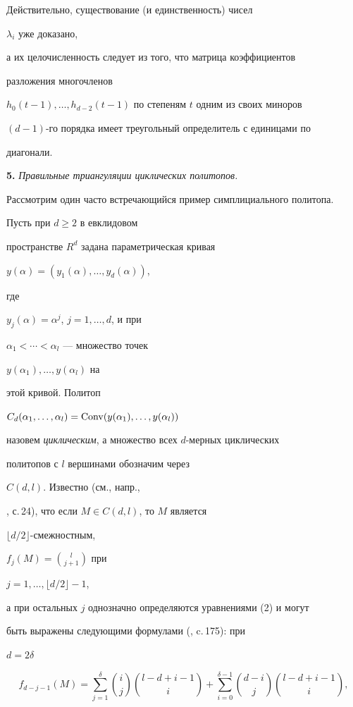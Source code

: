 Действительно, существование (и единственность) чисел


$\lambda_i$ уже доказано,


а их целочисленность следует из того, что матрица коэффициентов


разложения многочленов


$h_0(t-1),\dotsc,h_{d-2}(t-1)$ по степеням $t$ одним из своих миноров


$(d-1)$-го порядка имеет треугольный определитель с единицами по


диагонали.


\medskip





{\bf 5.} {\it Правильные триангуляции циклических политопов.}


Рассмотрим один часто встречающийся пример симплициального политопа.


Пусть при $d\ge 2$ в евклидовом


пространстве $R^d$ задана параметрическая кривая


$y(\alpha)=(y_1(\alpha),\dotsc,y_d(\alpha))$,


где


$y_j(\alpha)=\alpha^j$, $j=1,\dotsc,d$, и при


$\alpha_1<\dotsb<\alpha_l$ --- множество точек


$y(\alpha_1),\dotsc,y(\alpha_l)$ на


этой кривой. Политоп


$C_d(\alpha_1,\dotsc,\alpha_l)=\operatorname{Conv}(y(\alpha_1),\dotsc,y(\alpha_l))$


назовем {\em циклическим}, а множество всех $d$-мерных циклических


политопов с $l$ вершинами обозначим через


$C(d,l)$. Известно (см., напр.,


\cite{Em}, с.\,24), что если $M\in C(d,l)$, то $M$ является


$\lfloor d/2\rfloor$-смежностным,


$f_j(M)=\binom{l}{j+1}$ при


$j=1,\dotsc,\lfloor d/2\rfloor-1$,


а при остальных $j$ однозначно определяются уравнениями (2) и могут


быть выражены следующими формулами (\cite{Bre}, c.\,175): при


$d=2\delta$


\begin{equation}


f_{d-j-1}(M)=\sum^\delta_{j=1}\binom{i}{j}


\binom{l-d+i-1}{i}+\sum^{\delta-1}_{i=0}\binom{d-i}{j}


\binom{l-d+i-1}{i},


\end{equation}


